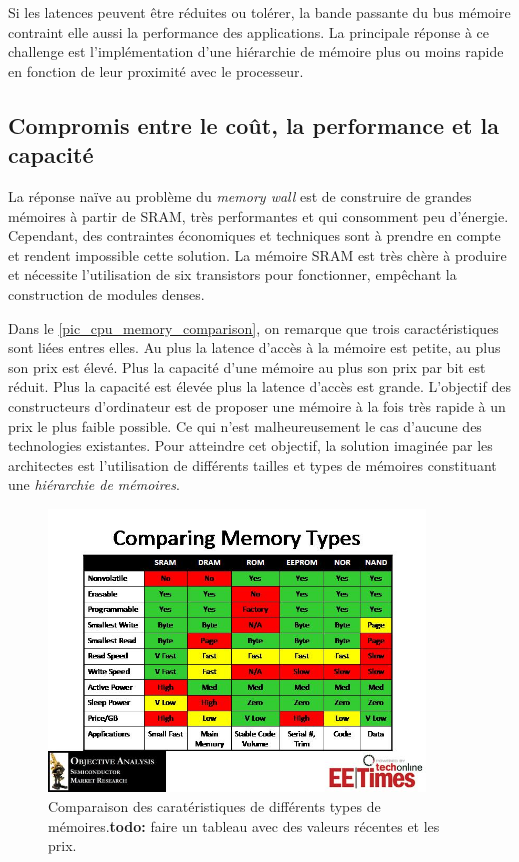 Si les latences peuvent être réduites ou tolérer, la bande passante du bus mémoire contraint elle aussi la performance des applications. La principale réponse à ce challenge est l’implémentation d’une hiérarchie de mémoire plus ou moins rapide en fonction de leur proximité avec le processeur. 


\subsection{Compromis entre le coût, la performance et la capacité } \label{sec:hierarchie_true}

La réponse naïve au problème du \textit{memory wall} est de construire de grandes mémoires à partir de SRAM, très performantes et qui consomment peu d'énergie. Cependant, des contraintes économiques et techniques sont à prendre en compte et rendent impossible cette solution. La mémoire SRAM est très chère à produire et nécessite l'utilisation de six transistors pour fonctionner, empêchant la construction de modules denses. 

Dans le \autoref{pic_cpu_memory_comparison}, on remarque que trois caractéristiques sont liées entres elles. Au plus la latence d'accès à la mémoire est petite, au plus son prix est élevé. Plus la capacité d'une mémoire au plus son prix par bit est réduit. Plus la capacité est élevée plus la latence d'accès est grande.
L'objectif des constructeurs d'ordinateur est de proposer une mémoire à la fois très rapide à un prix le plus faible possible. Ce qui n'est malheureusement le cas d'aucune des technologies existantes. Pour atteindre cet objectif, la solution imaginée par les architectes est l'utilisation de différents tailles et types de mémoires constituant une \textit{hiérarchie de mémoires}.


\begin{figure}
    \center
    \includegraphics[width=10cm]{images/cpu_memory_comparison.jpg}
    \caption{\label{pic_cpu_memory_comparison} Comparaison des caratéristiques de différents types de mémoires.\textbf{todo:} faire un tableau avec des valeurs récentes et les prix. }
\end{figure}



